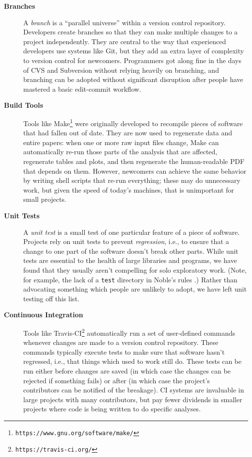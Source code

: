\documentclass[10pt]{article}
\newcommand{\withurl}[2]{{#1}\footnote{\texttt{#2}}}
\begin{document}
\begin{description}

\item[\textbf{Branches}] A \emph{branch} is a ``parallel universe''
  within a version control repository. Developers create branches so
  that they can make multiple changes to a project independently. They
  are central to the way that experienced developers use systems like
  Git, but they add an extra layer of complexity to version control
  for newcomers.  Programmers got along fine in the days of CVS and
  Subversion without relying heavily on branching, and branching can
  be adopted without significant disruption after people have mastered
  a basic edit-commit workflow.

\item[\textbf{Build Tools}] Tools like
  \withurl{Make}{https://www.gnu.org/software/make/} were originally
  developed to recompile pieces of software that had fallen out of
  date. They are now used to regenerate data and entire papers: when
  one or more raw input files change, Make can automatically re-run
  those parts of the analysis that are affected, regenerate tables and
  plots, and then regenerate the human-readable PDF that depends on
  them.  However, newcomers can achieve the same behavior by writing
  shell scripts that re-run everything; these may do unnecessary work,
  but given the speed of today's machines, that is unimportant for
  small projects.

\item[\textbf{Unit Tests}] A \emph{unit test} is a small test of one
  particular feature of a piece of software. Projects rely on unit
  tests to prevent \emph{regression}, i.e., to ensure that a change to
  one part of the software doesn't break other parts. While unit tests
  are essential to the health of large libraries and programs, we have
  found that they usually aren't compelling for solo exploratory
  work. (Note, for example, the lack of a \texttt{test} directory in
  Noble's rules \cite{noble2009}.)  Rather than advocating something
  which people are unlikely to adopt, we have left unit testing off
  this list.

\item[\textbf{Continuous Integration}] Tools like
  \withurl{Travis-CI}{https://travis-ci.org/} automatically run a set
  of user-defined commands whenever changes are made to a version
  control repository. These commands typically execute tests to make
  sure that software hasn't regressed, i.e., that things which used to
  work still do. These tests can be run either before changes are
  saved (in which case the changes can be rejected if something fails)
  or after (in which case the project's contributors can be notified
  of the breakage). CI systems are invaluable in large projects with
  many contributors, but pay fewer dividends in smaller projects where
  code is being written to do specific analyses.


\end{description}
\end{document}
